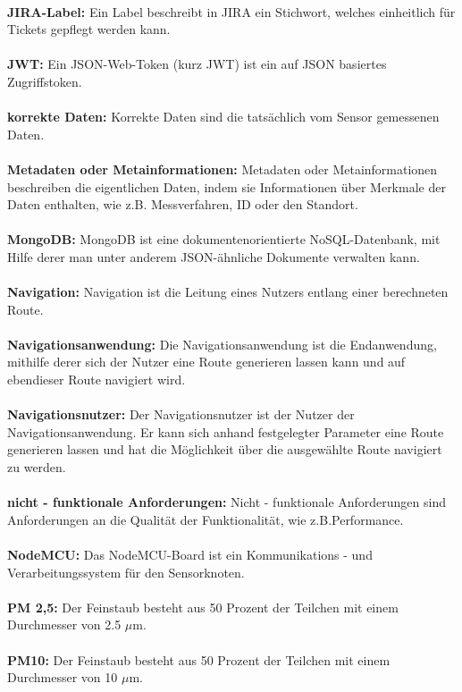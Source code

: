 \\
\textbf{JIRA-Label:} Ein Label beschreibt in JIRA ein Stichwort, welches einheitlich für Tickets gepflegt werden kann.  \\
\\
\textbf{JWT:} Ein JSON-Web-Token (kurz JWT) ist ein auf JSON basiertes Zugriffstoken.  \\
\\
\textbf{korrekte Daten:} Korrekte Daten sind die tatsächlich vom Sensor gemessenen Daten.\\
\\
\textbf{Metadaten oder Metainformationen:} Metadaten oder Metainformationen beschreiben die eigentlichen Daten, indem sie Informationen über Merkmale der Daten enthalten, wie z.B. Messverfahren, ID oder den Standort. \\
\\
\textbf{MongoDB:} MongoDB ist eine dokumentenorientierte NoSQL-Datenbank, mit Hilfe derer man unter anderem JSON-ähnliche Dokumente verwalten kann.  \\
\\
\textbf{Navigation:}
Navigation ist die Leitung eines Nutzers entlang einer berechneten Route.\\
\\
\textbf{Navigationsanwendung:} Die Navigationsanwendung ist die Endanwendung, mithilfe derer sich der Nutzer eine Route generieren lassen kann und auf ebendieser Route navigiert wird.  \\
\\
\textbf{Navigationsnutzer:} Der Navigationsnutzer ist der Nutzer der Navigationsanwendung. Er kann sich anhand festgelegter Parameter eine Route generieren lassen und hat die Möglichkeit über die ausgewählte Route navigiert zu werden.  \\
\\
\textbf{nicht - funktionale Anforderungen:} Nicht - funktionale Anforderungen sind Anforderungen an die Qualität der Funktionalität, wie z.B.Performance. \\
\\
\textbf{NodeMCU:} Das NodeMCU-Board ist ein Kommunikations - und Verarbeitungssystem für den Sensorknoten. \\
\\
\textbf{PM 2,5:} Der Feinstaub besteht aus 50 Prozent der Teilchen mit einem Durchmesser von 2.5  $\mu$m.\\
\\
\textbf{PM10:} Der Feinstaub besteht aus 50 Prozent der Teilchen mit einem Durchmesser von 10 $\mu$m. \\
